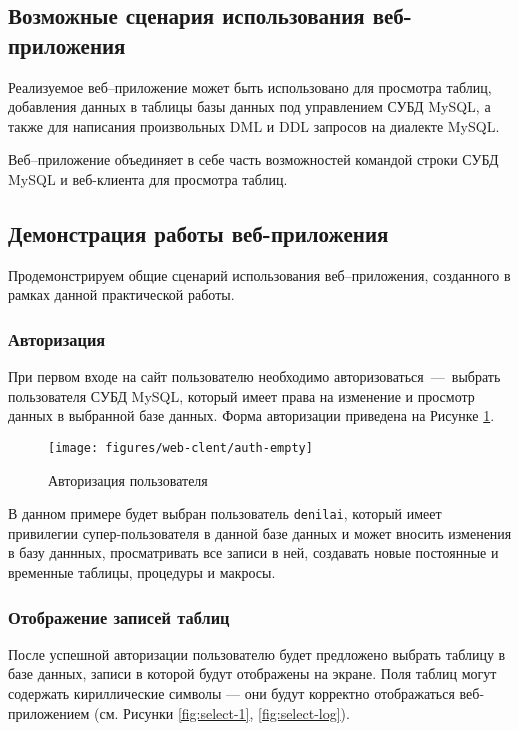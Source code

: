 \subsection{Возможные сценария использования веб-приложения}

Реализуемое веб--приложение может быть использовано для просмотра таблиц, добавления данных в таблицы базы данных под управлением СУБД MySQL, а также для написания произвольных DML и DDL запросов на диалекте MySQL. 

Веб--приложение объединяет в себе часть возможностей командой строки СУБД MySQL и веб-клиента для просмотра таблиц.


\subsection{Демонстрация работы веб-приложения}

Продемонстрируем общие сценарий использования веб--приложения, созданного в рамках данной практической работы. 

\subsubsection{Авторизация}
При первом входе на сайт пользователю необходимо авторизоваться~---~выбрать пользователя СУБД MySQL, который имеет права на изменение и просмотр данных в выбранной базе данных. Форма авторизации приведена на Рисунке \ref{fig:auth-empty}.
\begin{figure}[h!]
	\centering
	\texttt{[image: figures/web-clent/auth-empty]}
	\caption{Авторизация пользователя}
	\label{fig:auth-empty}
\end{figure}


 В данном примере будет выбран пользователь \texttt{denilai}, который имеет привилегии супер-пользователя в данной базе данных и может вносить изменения в базу даннных, просматривать все записи в ней, создавать новые постоянные и временные таблицы, процедуры и макросы.



\subsubsection{Отображение записей таблиц}
После успешной авторизации пользователю будет предложено выбрать таблицу в базе данных, записи в которой будут отображены на экране. Поля таблиц могут содержать кириллические символы --- они будут корректно отображаться веб-приложением (см. Рисунки \ref{fig:select-1}, \ref{fig:select-log}). %

